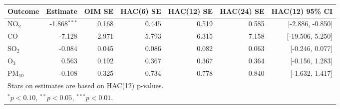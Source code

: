 \begin{tabular}{lrrrrrr}
\toprule
Outcome & Estimate & OIM SE & HAC(6) SE & HAC(12) SE & HAC(24) SE & HAC(12) 95\% CI \\
\midrule
NO$_2$ & -1.868$^{***}$ & 0.168 & 0.445 & 0.519 & 0.585 & [-2.886, -0.850] \\
CO & -7.128 & 2.971 & 5.793 & 6.315 & 7.158 & [-19.506, 5.250] \\
SO$_2$ & -0.084 & 0.045 & 0.086 & 0.082 & 0.063 & [-0.246, 0.077] \\
O$_3$ & 0.563 & 0.192 & 0.367 & 0.367 & 0.364 & [-0.156, 1.283] \\
PM$_{10}$ & -0.108 & 0.325 & 0.734 & 0.778 & 0.840 & [-1.632, 1.417] \\
\bottomrule
\multicolumn{7}{l}{\footnotesize Stars on estimates are based on HAC(12) p-values.} \\
\multicolumn{7}{l}{\footnotesize $^{*}p<0.10$, $^{**}p<0.05$, $^{***}p<0.01$.} \\
\end{tabular}
